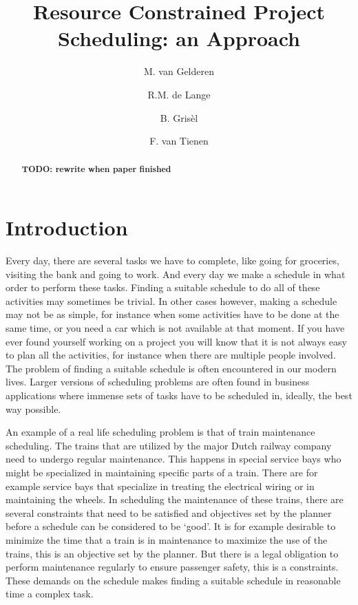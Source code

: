 \documentclass{article}
\title{Resource Constrained Project Scheduling: an Approach}
\author{M. van Gelderen  \and
    R.M. de Lange \and
    B. Gris\`el \and
    F. van Tienen}
\date{}
\theoremstyle{definition}
\newcommand{\TODO}[1]{{\color{red}\textbf{TODO: #1}}}
\begin{document}
\maketitle
\thispagestyle{empty}

\begin{abstract}
\TODO{rewrite when paper finished}
\end{abstract}


\newpage


\section{Introduction}

Every day, there are several tasks we have to complete, like going for groceries, visiting the bank and going to work.
And every day we make a schedule in what order to perform these tasks.
Finding a suitable schedule to do all of these activities may sometimes be trivial. 
In other cases however, making a schedule may not be as simple, for instance when some activities have to be done at the same time, or you need a car which is not available at that moment. 
If you have ever found yourself working on a project you will know that it is not always easy to plan all the activities, for instance when there are multiple people involved. 
The problem of finding a suitable schedule is often encountered in our modern lives.
Larger versions of scheduling problems are often found in business applications where immense sets of tasks have to be scheduled in, ideally, the best way possible.

An example of a real life scheduling problem is that of train maintenance scheduling. 
The trains that are utilized by the major Dutch railway company need to undergo regular maintenance. 
This happens in special service bays who might be specialized in maintaining specific parts of a train. 
There are for example service bays that specialize in treating the electrical wiring or in maintaining the wheels.
In scheduling the maintenance of these trains, there are several constraints that need to be satisfied and objectives set by the planner before a schedule can be considered to be `good'. 
It is for example desirable to minimize the time that a train is in maintenance to maximize the use of the trains, this is an objective set by the planner.
But there is a legal obligation to perform maintenance regularly to ensure passenger safety, this is a constraints. 
These demands on the schedule makes finding a suitable schedule in reasonable time a complex task. 
\end{document}
